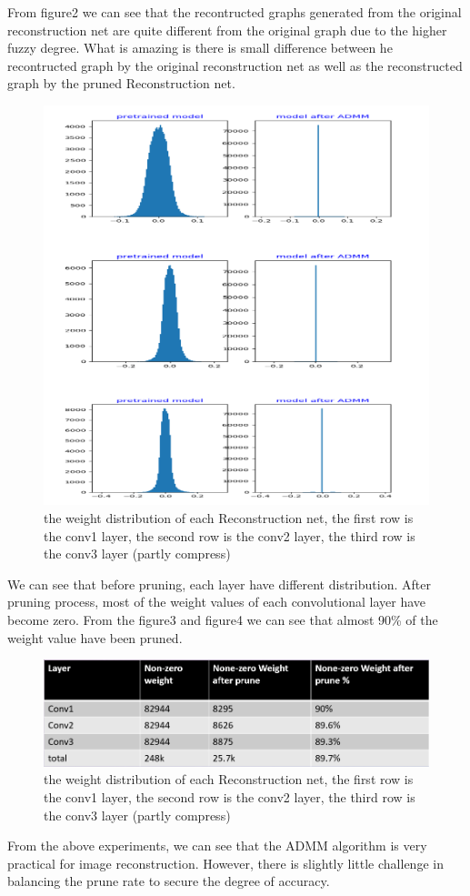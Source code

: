 \documentclass{acmtog} %
\begin{document}
From figure2 we can see that the recontructed graphs generated from the original reconstruction net are quite different from the original graph due to the higher fuzzy degree. What is amazing is there is small difference between he recontructed graph by the original reconstruction net as well as the reconstructed graph by the pruned Reconstruction net.
\begin{figure}[!h]
  \label{fig:res1}
  \centering
  \includegraphics[scale = 0.65]{graph/exp_2.png}
  \caption{the weight distribution of each Reconstruction net, the first row is the conv1 layer, the second row is the conv2 layer, the third row is the conv3 layer (partly compress)}
\end{figure}
We can see that before pruning, each layer have different distribution. After pruning process, most of the weight values  of each convolutional layer have become zero. From the figure3 and figure4 we can see that almost 90\% of the weight value have been pruned.
\begin{figure}[!h]
  \label{fig:res2}
  \centering
  \includegraphics[scale = 0.3]{graph/exp_3.png}
  \caption{the weight distribution of each Reconstruction net, the first row is the conv1 layer, the second row is the conv2 layer, the third row is the conv3 layer (partly compress)}
\end{figure}
From the above experiments, we can see that the ADMM algorithm is very practical for image reconstruction. However, there is slightly little challenge in balancing the  prune rate to secure the degree of accuracy.
\end{document}
